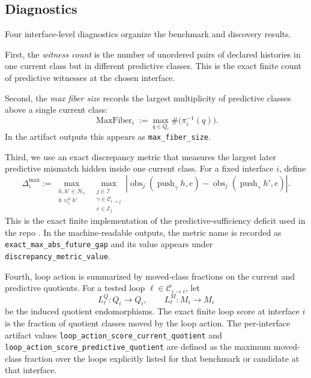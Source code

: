 \documentclass[11pt]{article}
\newcommand{\CurrentQ}{Q}
\newcommand{\PredictiveQ}{M}
\newcommand{\Histories}{\mathcal{H}}
\newcommand{\Interfaces}{\mathcal{I}}
\newcommand{\CurrentEquiv}{\equiv^{0}}
\theoremstyle{definition}
\begin{document}
\subsection{Diagnostics}\label{subsec:eff-diagnostics}
Four interface-level diagnostics organize the benchmark and discovery results.

First, the \emph{witness count} is the number of unordered pairs of declared histories in one current class but in different predictive classes. This is the exact finite count of predictive witnesses at the chosen interface.

Second, the \emph{max fiber size} records the largest multiplicity of predictive classes above a single current class:
\begin{equation}
\operatorname{MaxFiber}_i
:=
\max_{q\in\CurrentQ_i}
\#\bigl(\pi_i^{-1}(q)\bigr).
\label{eq:max-fiber}
\end{equation}
In the artifact outputs this appears as \texttt{max\_fiber\_size}.

Third, we use an exact discrepancy metric that measures the largest later predictive mismatch hidden inside one current class. For a fixed interface $i$, define
\begin{equation}
\Delta_i^{\max}
:=
\max_{\substack{h,h'\in\Histories_i\\ h \CurrentEquiv_i h'}}
\;
\max_{\substack{j\in\Interfaces\\ \gamma\in\mathcal{C}_{i\to j}\\ e\in\mathcal{E}_j}}
\left|
\operatorname{obs}_j(\operatorname{push}_{\gamma} h,e)
-
\operatorname{obs}_j(\operatorname{push}_{\gamma} h',e)
\right|.
\label{eq:exact-max-gap}
\end{equation}
This is the exact finite implementation of the predictive-sufficiency deficit used in the repo \citep{Tsiokos2026CastStone}. In the machine-readable outputs, the metric name is recorded as \texttt{exact\_max\_abs\_future\_gap} and its value appears under \texttt{discrepancy\_metric\_value}.

Fourth, loop action is summarized by moved-class fractions on the current and predictive quotients. For a tested loop $\ell\in\mathcal{C}_{i\to i}$, let
\[
L^{\CurrentQ}_{\ell} : \CurrentQ_i \to \CurrentQ_i,
\qquad
L^{\PredictiveQ}_{\ell} : \PredictiveQ_i \to \PredictiveQ_i
\]
be the induced quotient endomorphisms. The exact finite loop score at interface $i$ is the fraction of quotient classes moved by the loop action. The per-interface artifact values
\texttt{loop\_action\_score\_current\_quotient}
and
\texttt{loop\_action\_score\_predictive\_quotient}
are defined as the maximum moved-class fraction over the loops explicitly listed for that benchmark or candidate at that interface.
\end{document}

